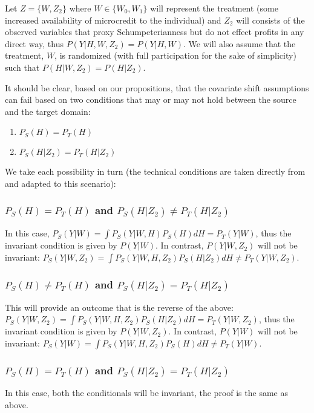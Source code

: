 \documentclass[a4paper,12pt]{article}
\begin{document}
Let $Z = \{ W, Z_2 \}$ where $W \in \{ W_0, W_1\}$ will represent the treatment (some increased availability of microcredit to the individual) and $Z_2$ will consists of the observed variables that proxy Schumpeterianness but do not effect profits in any direct way, thus $P(Y|H,W,Z_2) = P(Y|H,W)$. We will also assume that the treatment, $W$, is randomized (with full participation for the sake of simplicity) such that $P(H|W,Z_2) = P(H|Z_2)$.

It should be clear, based on our propositions, that the covariate shift assumptions can fail based on two conditions that may or may not hold between the source and the target domain:

\begin{enumerate}
\item $P_S(H) = P_T(H)$
\item $P_S(H|Z_2) = P_T(H|Z_2)$
\end{enumerate}

We take each possibility in turn (the technical conditions are taken directly from \cite{Pearl2014} and adapted to this scenario):

\subsubsection*{$P_S(H) = P_T(H)$ and $P_S(H|Z_2) \neq P_T(H|Z_2)$}

In this case, $P_S(Y|W) = \int P_S(Y|W,H)P_S(H) dH = P_T(Y|W)$, thus the invariant condition is given by $P(Y|W)$. In contrast, $P(Y|W,Z_2)$ will not be invariant: $P_S(Y|W,Z_2) = \int P_S(Y|W,H,Z_2)P_S(H|Z_2) dH \neq P_T(Y|W,Z_2)$.

\subsubsection*{$P_S(H) \neq P_T(H)$ and $P_S(H|Z_2) = P_T(H|Z_2)$}

This will provide an outcome that is the reverse of the above: $P_S(Y|W,Z_2) = \int P_S(Y|W,H,Z_2)P_S(H|Z_2) dH = P_T(Y|W,Z_2)$, thus the invariant condition is given by $P(Y|W,Z_2)$. In contrast, $P(Y|W)$ will not be invariant: $P_S(Y|W) = \int P_S(Y|W,H,Z_2)P_S(H) dH \neq P_T(Y|W)$.

\subsubsection*{$P_S(H) = P_T(H)$ and $P_S(H|Z_2) = P_T(H|Z_2)$}

In this case, both the conditionals will be invariant, the proof is the same as above.
\end{document}

